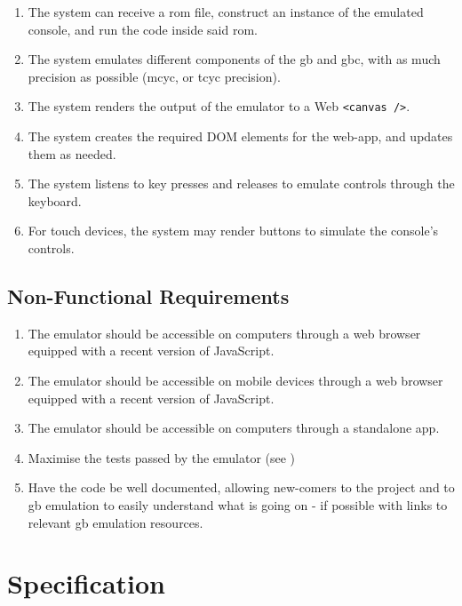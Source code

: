\documentclass[11pt]{report}
\begin{document}
\begin{enumerate}[start=1,label=F\arabic*.]
    \item The system can receive a \gls{rom} file, construct an instance of the emulated console, and run the code inside said \gls{rom}.
    \item The system emulates different components of the \gls{gb} and \gls{gbc}, with as much precision as possible (\gls{mcyc}, or \gls{tcyc} precision).
    \item The system renders the output of the emulator to a Web \texttt{<canvas />}.
    \item The system creates the required DOM elements for the web-app, and updates them as needed.
    \item The system listens to key presses and releases to emulate controls through the keyboard.
    \item For touch devices, the system may render buttons to simulate the console's controls.
\end{enumerate}

\subsection{Non-Functional Requirements}

\begin{enumerate}[start=1,label=N\arabic*.]
    \item The emulator should be accessible on computers through a web browser equipped with a recent version of JavaScript.
    \item The emulator should be accessible on mobile devices through a web browser equipped with a recent version of JavaScript.
    \item The emulator should be accessible on computers through a standalone app.
    \item Maximise the tests passed by the emulator (see )
    \item Have the code be well documented, allowing new-comers to the project and to \gls{gb} emulation to easily understand what is going on - if possible with links to relevant \glsdesc{gb} emulation resources.
\end{enumerate}


\section{Specification}
\end{document}
